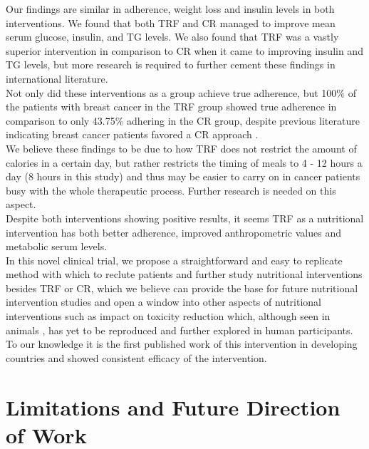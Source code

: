 \documentclass[journal,article,submit,pdftex,moreauthors]{Definitions/mdpi}
\begin{document}
Our findings are similar in adherence, weight loss and insulin levels in both interventions. We found that both TRF and CR managed to improve mean serum glucose, insulin, and TG levels. We also found that TRF was a vastly superior intervention in comparison to CR when it came to improving insulin and TG levels, but more research is required to further cement these findings in international literature.\\

Not only did these interventions as a group achieve true adherence, but 100\% of the patients with breast cancer in the TRF group showed true adherence in comparison to only 43.75\% adhering in the CR group, despite previous literature indicating breast cancer patients favored a CR approach \cite{kalam2023intermittent}.\\

We believe these findings to be due to how TRF does not restrict the amount of calories in a certain day, but rather restricts the timing of meals to 4 - 12 hours a day (8 hours in this study) and thus may be easier to carry on in cancer patients  busy with the whole therapeutic process. Further research is needed on this aspect.\\

Despite both interventions showing positive results, it seems TRF as a nutritional intervention has both better adherence, improved anthropometric values and metabolic serum levels.\\

In this novel clinical trial, we propose a straightforward and easy to replicate method with which to reclute patients and further study nutritional interventions besides TRF or CR, which we believe can provide the base for future nutritional intervention studies and open a window into other aspects of nutritional interventions such as impact on toxicity reduction which, although seen in animals \cite{cortellino2023fasting, de2019fasting}, has yet to be reproduced and further explored in human participants.\\

To our knowledge it is the first published work of this intervention in developing countries and showed consistent efficacy of the intervention.\\



\section{Limitations and Future Direction of Work}
\end{document}
